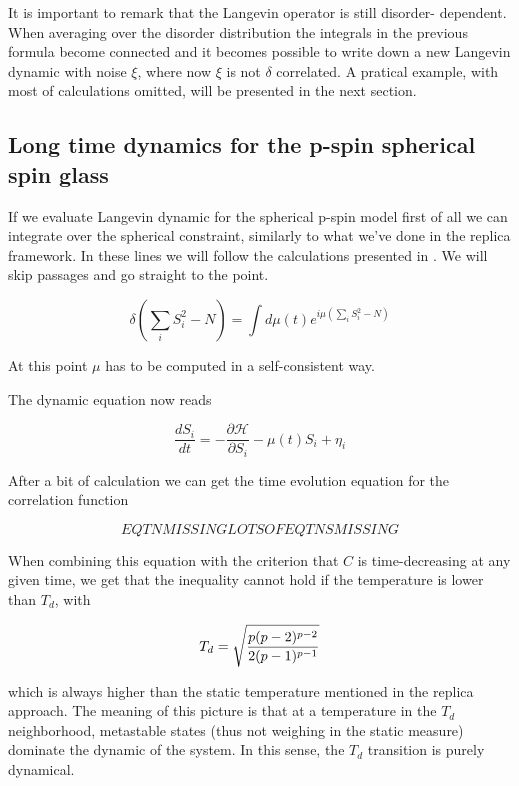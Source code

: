 \documentclass{article}
\begin{document}
It is important to remark that the Langevin operator is still disorder- dependent. When averaging over the disorder distribution
the integrals in the previous formula become connected and it becomes possible to write down a new Langevin dynamic with noise $\xi$, where now
$\xi$ is not $\delta$ correlated. A pratical example, with most of calculations omitted, will be presented in the next section.

\subsection{Long time dynamics for the p-spin spherical spin glass}

If we evaluate Langevin dynamic for the spherical p-spin model first of all we can integrate over the spherical constraint, similarly to what we've done in the replica framework.
In these lines we will follow the calculations presented in \cite{CrisantiSommers}. We will skip passages and go straight to the point. 


\begin{equation}
\delta( \sum_i S_i^2 -N) = \int d\mu(t) e^{i\mu ( \sum_i S_i^2 -N) }
\end{equation}

At this point $\mu$ has to be computed in a self-consistent way. 


The dynamic equation now reads

\begin{equation}
  \frac{dS_i}{dt} = - \frac{\partial \mathcal{H}}{\partial S_i} - \mu (t) S_i + \eta_i
\end{equation}

After a bit of calculation we can get the time evolution equation for the correlation function

\begin{equation}
EQTN MISSING

LOTS OF EQTNS MISSING
\end{equation}

When combining this equation with the criterion that $C$ is time-decreasing at any given time, we get that
the inequality cannot hold if the temperature is lower than $T_d$, with 

\begin{equation}
T_d = \sqrt{  {p(p-2)^{p-2}}      \over      {2(p-1)^{p-1}}} 
\end{equation}

which is always higher than the static temperature mentioned in the replica approach.
 The meaning of this picture is that at a temperature in the $T_d$ neighborhood, 
metastable states (thus not weighing in the static measure) dominate the dynamic of the system.
 In this sense, the $T_d$ transition is purely dynamical.
\end{document}

